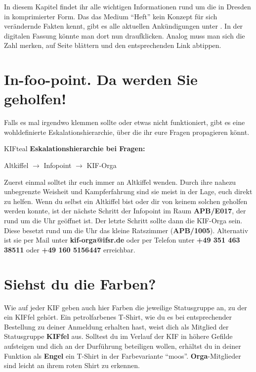
In diesem Kapitel findet ihr alle wichtigen Informationen rund um die \KIF{} in Dresden in komprimierter Form.
Das das Medium \enquote{Heft} kein Konzept für sich verändernde Fakten kennt, gibt es alle aktuellen Ankündigungen unter .
In der digitalen Fassung könnte man dort nun draufklicken.
Analog muss man sich die Zahl merken, auf Seite \pageref{links} blättern und den entsprechenden Link abtippen.

\section*{In-foo-point. Da werden Sie geholfen!}

Falls es mal irgendwo klemmen sollte oder etwas nicht funktioniert, gibt es eine wohldefinierte Eskalationshierarchie, über die ihr eure Fragen propagieren könnt.

\begin{awesomeblock}[KIFteal]{2pt}{\faQuestion}{KIFteal}
    \textbf{Eskalationshierarchie bei Fragen:}

  Altkiffel $\longrightarrow$ Infopoint $\longrightarrow$ KIF-Orga
\end{awesomeblock}

Zuerst einmal solltet ihr euch immer an Altkiffel wenden.
Durch ihre nahezu unbegrenzte Weisheit und Kampferfahrung sind sie meist in der Lage, euch direkt zu helfen.
Wenn du selbst ein Altkiffel bist oder dir von keinem solchen geholfen werden konnte, ist der nächste Schritt der Infopoint im Raum \textbf{APB/E017}, der rund um die Uhr geöffnet ist.
Der letzte Schritt sollte dann die KIF-Orga sein.
Diese besetzt rund um die Uhr das kleine Ratszimmer (\textbf{APB/1005}).
Alternativ ist sie per Mail unter \textbf{kif-orga@ifsr.de} oder per Telefon unter \textbf{+49 351 463 38511} oder \textbf{+49 160 5156447} erreichbar.

\section*{Siehst du die Farben?}

Wie auf jeder KIF geben auch hier Farben die jeweilige Statusgruppe an, zu der ein KIFfel gehört.
Ein petrolfarbenes T-Shirt, wie du es bei entsprechender Bestellung zu deiner Anmeldung erhalten hast, weist dich als Mitglied der Statusgruppe \textbf{KIFfel} aus.
Solltest du im Verlauf der KIF in höhere Gefilde aufsteigen und dich an der Durführung beteiligen wollen, erhältst du in deiner Funktion als \textbf{Engel} ein T-Shirt in der Farbevariante \enquote{moos}.
\textbf{Orga}-Mitglieder sind leicht an ihrem roten Shirt zu erkennen.

